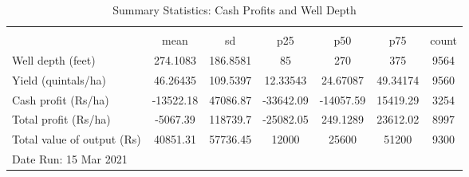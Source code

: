 \begin{table}[htbp]\centering
\def\sym#1{\ifmmode^{#1}\else\(^{#1}\)\fi}
\caption{Summary Statistics: Cash Profits and Well Depth}
\begin{tabular*}{1.0\hsize}{@{\hskip\tabcolsep\extracolsep\fill}l*{1}{cccccc}}
\toprule
                                    &\multicolumn{6}{c}{}                                                         \\
                                    &        mean&          sd&         p25&         p50&         p75&       count\\
\midrule
Well depth (feet)                   &    274.1083&    186.8581&          85&         270&         375&        9564\\
Yield (quintals/ha)                 &    46.26435&    109.5397&    12.33543&    24.67087&    49.34174&        9560\\
Cash profit (Rs/ha)                 &   -13522.18&    47086.87&   -33642.09&   -14057.59&    15419.29&        3254\\
Total profit (Rs/ha)                &    -5067.39&    118739.7&   -25082.05&    249.1289&    23612.02&        8997\\
Total value of output (Rs)          &    40851.31&    57736.45&       12000&       25600&       51200&        9300\\
\bottomrule
\multicolumn{7}{l}{\footnotesize Date Run: 15 Mar 2021}\\
\end{tabular*}
\end{table}
